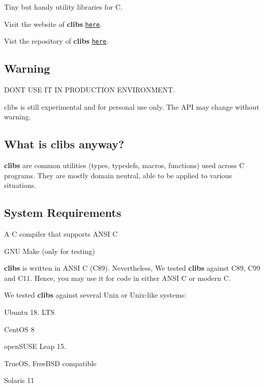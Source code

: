 \href{https://opensource.org/licenses/MIT}{\tt } \href{https://ci.appveyor.com/project/cwchentw/clibs}{\tt }

Tiny but handy utility libraries for C.

Visit the website of {\bfseries clibs} \href{https://cwchentw.github.io/clibs/html/index.html}{\tt here}.

Vist the repository of {\bfseries clibs} \href{https://github.com/cwchentw/clibs/}{\tt here}.

\subsection*{Warning}

D\+ON\textquotesingle{}T U\+SE IT IN P\+R\+O\+D\+U\+C\+T\+I\+ON E\+N\+V\+I\+R\+O\+N\+M\+E\+NT.

clibs is still experimental and for personal use only. The A\+PI may change without warning.

\subsection*{What is clibs anyway?}

{\bfseries clibs} are common utilities (types, typedefs, macros, functions) used across C programs. They are mostly domain neutral, able to be applied to various situations.

\subsection*{System Requirements}


\begin{DoxyItemize}
\item A C compiler that supports A\+N\+SI C
\item G\+NU Make (only for testing)
\end{DoxyItemize}

{\bfseries clibs} is written in A\+N\+SI C (C89). Nevertheless, We tested {\bfseries clibs} against C89, C99 and C11. Hence, you may use it for code in either A\+N\+SI C or modern C.

We tested {\bfseries clibs} against several Unix or Unix-\/like systems\+:


\begin{DoxyItemize}
\item Ubuntu 18. L\+TS
\item Cent\+OS 8
\item open\+S\+U\+SE Leap 15.
\item True\+OS, Free\+B\+SD compatible
\item Solaris 11
\end{DoxyItemize}

